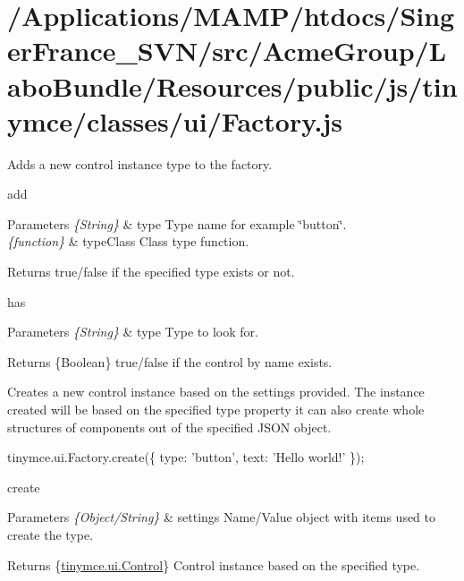 \hypertarget{_2_applications_2_m_a_m_p_2htdocs_2_singer_france__s_v_n_2src_2_acme_group_2_labo_bundle_2_resouc48920ac679ad333e835de9d2e2e1317}{\section{/\+Applications/\+M\+A\+M\+P/htdocs/\+Singer\+France\+\_\+\+S\+V\+N/src/\+Acme\+Group/\+Labo\+Bundle/\+Resources/public/js/tinymce/classes/ui/\+Factory.\+js}
}
Adds a new control instance type to the factory.

add 
\begin{DoxyParams}{Parameters}
{\em \{\+String\}} & type Type name for example \char`\"{}button\char`\"{}. \\
\hline
{\em \{function\}} & type\+Class Class type function.\\
\hline
\end{DoxyParams}
Returns true/false if the specified type exists or not.

has 
\begin{DoxyParams}{Parameters}
{\em \{\+String\}} & type Type to look for. \\
\hline
\end{DoxyParams}
\begin{DoxyReturn}{Returns}
\{Boolean\} true/false if the control by name exists.
\end{DoxyReturn}
Creates a new control instance based on the settings provided. The instance created will be based on the specified type property it can also create whole structures of components out of the specified J\+S\+O\+N object.

tinymce.\+ui.\+Factory.\+create(\{ type\+: 'button', text\+: 'Hello world!' \});

create 
\begin{DoxyParams}{Parameters}
{\em \{\+Object/\+String\}} & settings Name/\+Value object with items used to create the type. \\
\hline
\end{DoxyParams}
\begin{DoxyReturn}{Returns}
\{\hyperlink{classtinymce_1_1ui_1_1_control}{tinymce.\+ui.\+Control}\} Control instance based on the specified type.
\end{DoxyReturn}

\begin{DoxyCodeInclude}
\end{DoxyCodeInclude}
 